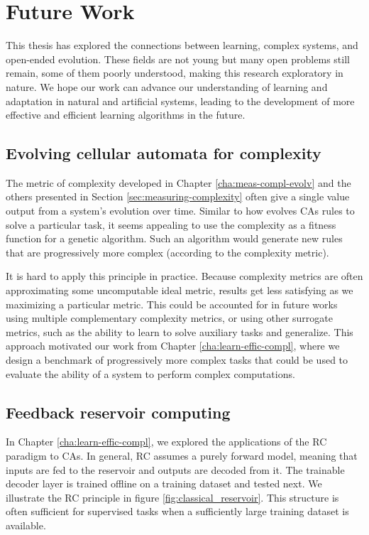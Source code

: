 \section{Future Work}

This thesis has explored the connections between learning, complex systems, and
open-ended evolution. These fields are not young but many open problems still
remain, some of them poorly understood, making this research exploratory in
nature. We hope our work can advance our understanding of learning and
adaptation in natural and artificial systems, leading to the development of more
effective and efficient learning algorithms in the future.

\subsection{Evolving cellular automata for complexity}

The metric of complexity developed in Chapter \ref{cha:meas-compl-evolv} and the
others presented in Section \ref{sec:measuring-complexity} often give a single
value output from a system's evolution over time. Similar to how
\textcite{mitchellEvolvingCellularAutomata1996} evolves \acp{CA} rules to solve
a particular task, it seems appealing to use the complexity as a fitness
function for a genetic algorithm. Such an algorithm would generate new rules
that are progressively more complex (according to the complexity metric).

It is hard to apply this principle in practice. Because complexity metrics are
often approximating some uncomputable ideal metric, results get less satisfying
as we maximizing a particular metric. This could be accounted for in future
works using multiple complementary complexity metrics, or using other surrogate
metrics, such as the ability to learn to solve auxiliary tasks and generalize.
This approach motivated our work from Chapter \ref{cha:learn-effic-compl}, where
we design a benchmark of progressively more complex tasks that could be used to
evaluate the ability of a system to perform complex computations.

\subsection{Feedback reservoir computing}

In Chapter \ref{cha:learn-effic-compl}, we explored the applications of the
\ac{RC} paradigm to \acp{CA}. In general, \ac{RC} assumes a purely forward
model, meaning that inputs are fed to the reservoir and outputs are decoded from
it. The trainable decoder layer is trained offline on a training dataset and
tested next. We illustrate the \ac{RC} principle in figure
\ref{fig:classical_reservoir}. This structure is often sufficient for supervised
tasks when a sufficiently large training dataset is available.

